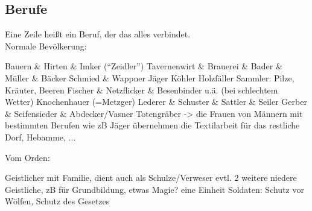 \subsection{Berufe}
Eine Zeile heißt ein Beruf, der das alles verbindet. \\
Normale Bevölkerung:
\begin{outline}
	\1 Bauern \& Hirten \& Imker ("`Zeidler"')
	\1 Tavernenwirt \& Brauerei \& Bader \& Müller \& Bäcker
	\1 Schmied \& Wappner
	\1 Jäger
	\1 Köhler
	\1 Holzfäller
	\1 Sammler: Pilze, Kräuter, Beeren
	\1 Fischer \& Netzflicker \& Besenbinder u.ä. (bei schlechtem Wetter)
	\1 Knochenhauer (=Metzger)
	\1 Lederer \& Schuster \& Sattler \& Seiler
	\1 Gerber \& Seifensieder \& Abdecker/Vasner
	\1 Totengräber
	\1 -> die Frauen von Männern mit bestimmten Berufen wie zB Jäger übernehmen die Textilarbeit für das restliche Dorf, Hebamme, ...
\end{outline}

Vom Orden:
\begin{outline}
	\1 Geistlicher mit Familie, dient auch als Schulze/Verweser
	\1 evtl. 2 weitere niedere Geistliche, zB für Grundbildung, etwas Magie?
	\1 eine Einheit Soldaten: Schutz vor Wölfen, Schutz des Gesetzes
\end{outline}
